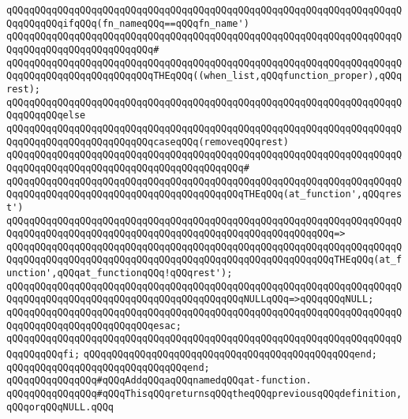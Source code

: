 \verb|qQQqqQQqqQQqqQQqqQQqqQQqqQQqqQQqqQQqqQQqqQQqqQQqqQQqqQQqqQQqqQQqqQQqqQQqqQQqqQQqifqQQq(fn_nameqQQq==qQQqfn_name')|\newline
\verb|qQQqqQQqqQQqqQQqqQQqqQQqqQQqqQQqqQQqqQQqqQQqqQQqqQQqqQQqqQQqqQQqqQQqqQQqqQQqqQQqqQQqqQQqqQQqqQQq#|\newline
\verb|qQQqqQQqqQQqqQQqqQQqqQQqqQQqqQQqqQQqqQQqqQQqqQQqqQQqqQQqqQQqqQQqqQQqqQQqqQQqqQQqqQQqqQQqqQQqqQQqTHEqQQq((when_list,qQQqfunction_proper),qQQqrest);|\newline
\verb|qQQqqQQqqQQqqQQqqQQqqQQqqQQqqQQqqQQqqQQqqQQqqQQqqQQqqQQqqQQqqQQqqQQqqQQqqQQqqQQqelse|\newline
\verb|qQQqqQQqqQQqqQQqqQQqqQQqqQQqqQQqqQQqqQQqqQQqqQQqqQQqqQQqqQQqqQQqqQQqqQQqqQQqqQQqqQQqqQQqqQQqqQQqcaseqQQq(removeqQQqrest)|\newline
\verb|qQQqqQQqqQQqqQQqqQQqqQQqqQQqqQQqqQQqqQQqqQQqqQQqqQQqqQQqqQQqqQQqqQQqqQQqqQQqqQQqqQQqqQQqqQQqqQQqqQQqqQQqqQQqqQQq#|\newline
\verb|qQQqqQQqqQQqqQQqqQQqqQQqqQQqqQQqqQQqqQQqqQQqqQQqqQQqqQQqqQQqqQQqqQQqqQQqqQQqqQQqqQQqqQQqqQQqqQQqqQQqqQQqqQQqqQQqTHEqQQq(at_function',qQQqrest')|\newline
\verb|qQQqqQQqqQQqqQQqqQQqqQQqqQQqqQQqqQQqqQQqqQQqqQQqqQQqqQQqqQQqqQQqqQQqqQQqqQQqqQQqqQQqqQQqqQQqqQQqqQQqqQQqqQQqqQQqqQQqqQQqqQQqqQQq=>|\newline
\verb|qQQqqQQqqQQqqQQqqQQqqQQqqQQqqQQqqQQqqQQqqQQqqQQqqQQqqQQqqQQqqQQqqQQqqQQqqQQqqQQqqQQqqQQqqQQqqQQqqQQqqQQqqQQqqQQqqQQqqQQqqQQqqQQqTHEqQQq(at_function',qQQqat_functionqQQq!qQQqrest');|\newline
\newline
\verb|qQQqqQQqqQQqqQQqqQQqqQQqqQQqqQQqqQQqqQQqqQQqqQQqqQQqqQQqqQQqqQQqqQQqqQQqqQQqqQQqqQQqqQQqqQQqqQQqqQQqqQQqqQQqqQQqNULLqQQq=>qQQqqQQqNULL;|\newline
\verb|qQQqqQQqqQQqqQQqqQQqqQQqqQQqqQQqqQQqqQQqqQQqqQQqqQQqqQQqqQQqqQQqqQQqqQQqqQQqqQQqqQQqqQQqqQQqqQQqesac;|\newline
\verb|qQQqqQQqqQQqqQQqqQQqqQQqqQQqqQQqqQQqqQQqqQQqqQQqqQQqqQQqqQQqqQQqqQQqqQQqqQQqqQQqfi;|\newline
\verb|qQQqqQQqqQQqqQQqqQQqqQQqqQQqqQQqqQQqqQQqqQQqqQQqend;|\newline
\verb|qQQqqQQqqQQqqQQqqQQqqQQqqQQqqQQqend;|\newline
\newline
\newline
\verb|qQQqqQQqqQQqqQQq#qQQqAddqQQqaqQQqnamedqQQqat-function.|\newline
\verb|qQQqqQQqqQQqqQQq#qQQqThisqQQqreturnsqQQqtheqQQqpreviousqQQqdefinition,qQQqorqQQqNULL.qQQq|\newline
